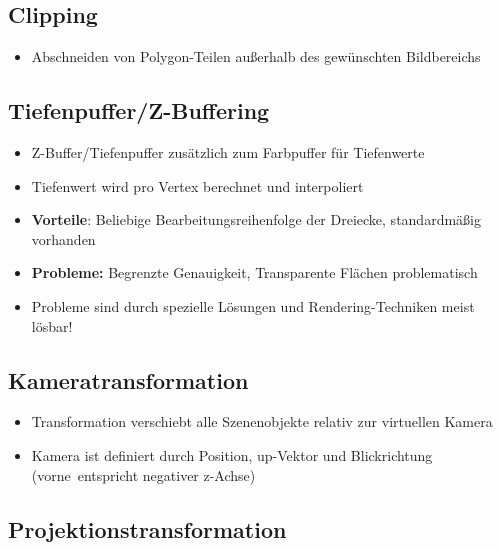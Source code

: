 \documentclass[10pt,a4paper]{article}
\begin{document}
	\subsection{Clipping}
	\label{rp:sub:clipping}
	
	\begin{itemize}
		\item Abschneiden von Polygon-Teilen außerhalb des gewünschten Bildbereichs
	\end{itemize}

	\subsection{Tiefenpuffer/Z-Buffering}
	\label{rp:sub:tiefenpuffer_z_buffering}
	
	\begin{itemize}
		\item Z-Buffer/Tiefenpuffer zusätzlich zum Farbpuffer für Tiefenwerte
		\item Tiefenwert wird pro Vertex berechnet und interpoliert
		\item \textbf{Vorteile}: Beliebige Bearbeitungsreihenfolge der Dreiecke, standardmäßig vorhanden
		\item \textbf{Probleme:} Begrenzte Genauigkeit, Transparente Flächen problematisch
		\item Probleme sind durch spezielle Lösungen und Rendering-Techniken meist lösbar!
	\end{itemize}

	\subsection{Kameratransformation}
	\label{rp:sub:kameratransformation}
	
	\begin{itemize}
		\item Transformation verschiebt alle Szenenobjekte relativ zur virtuellen Kamera
		\item Kamera ist definiert durch Position, up-Vektor und Blickrichtung (\glqq vorne\grqq\ entspricht negativer z-Achse)
	\end{itemize}

	\subsection{Projektionstransformation}
	\label{rp:sub:projektionstransformation}
	
\end{document}
